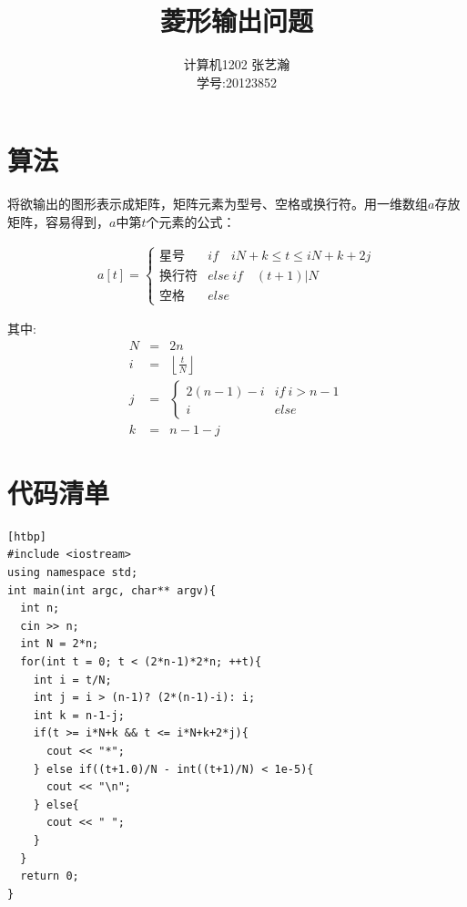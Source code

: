 \documentclass[11pt]{article}
\begin{document}
\title{菱形输出问题}
\author{计算机1202 \quad 张艺瀚\\学号:20123852}
\maketitle

\thispagestyle{fancy}
\normalsize

\section{算法}
将欲输出的图形表示成矩阵，矩阵元素为型号、空格或换行符。用一维数组$a$存放矩阵，容易得到，$a$中第$t$个元素的公式：

\begin{eqnarray*}
a[t] = 
\begin{cases}
\text{星号}                   & if\quad iN+k \le t \le iN+k+2j \\
\text{换行符}                 & else\ if\quad (t+1)|N \\
\text{空格}                   & else
\end{cases}
\end{eqnarray*}

其中:
\begin{eqnarray*}
N &=& 2n \\
i &=& \left \lfloor \frac{t}{N} \right \rfloor \\
j &=& 
\begin{cases}
2(n-1)-i                   & if\ i > n-1 \\
i                          & else
\end{cases} \\
k &=& n-1-j
\end{eqnarray*}

\section{代码清单}
\begin{center}
\begin{lstlisting}[caption = {代码清单}, label = {lst: code}][htbp]
#include <iostream>
using namespace std;
int main(int argc, char** argv){
  int n;
  cin >> n;
  int N = 2*n;
  for(int t = 0; t < (2*n-1)*2*n; ++t){
    int i = t/N;
    int j = i > (n-1)? (2*(n-1)-i): i;
    int k = n-1-j;
    if(t >= i*N+k && t <= i*N+k+2*j){
      cout << "*";
    } else if((t+1.0)/N - int((t+1)/N) < 1e-5){
      cout << "\n";
    } else{
      cout << " ";
    }
  }
  return 0;
}
\end{lstlisting}
\end{center}
\end{document}
